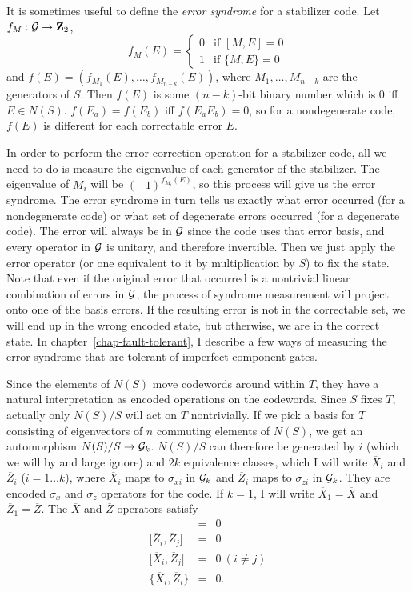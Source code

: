 \documentclass{report}
\newcommand{\G}{{\cal G}}
\newcommand{\X}{\sigma_x}
\newcommand{\Z}{\sigma_z}
\newcommand{\Xs}[1]{\sigma_{x{#1}}}
\newcommand{\Zs}[1]{\sigma_{z{#1}}}
\newcommand{\Xbar}{\overline{X}}
\newcommand{\Zbar}{\overline{Z}}
\begin{document}
It is sometimes useful to define the {\em error syndrome} for a stabilizer 
code.  Let $f_M : \G \rightarrow {\bf Z}_2$, 
\begin{equation}
f_M (E) = \left\{ \begin{array}{ll} 0 & \mbox{if $[M, E] = 0$} \\ 1 & 
\mbox{if $\{M, E\} = 0$} \end{array} \right.
\end{equation}
and $f (E) = (f_{M_1} (E), \ldots, f_{M_{n-k}} (E) )$, where $M_1, \ldots, 
M_{n-k}$ are the generators of $S$.  Then $f(E)$ is some $(n-k)$-bit binary 
number which is $0$ iff $E \in N(S)$.  $f(E_a) = f(E_b)$ iff $f(E_a E_b) = 0$, 
so for a nondegenerate code, $f(E)$ is different for each correctable error 
$E$.

In order to perform the error-correction operation for a stabilizer code, all 
we need to do is measure the eigenvalue of each generator of the 
stabilizer.  The eigenvalue of $M_i$ will be $(-1)^{f_{M_i} (E)}$, so this 
process will give us the error syndrome.  The error syndrome in turn tells 
us exactly what error occurred (for a nondegenerate code) or what set of 
degenerate errors occurred (for a degenerate code).  The error will always be 
in $\G$ since the code uses that error basis, and every operator in $\G$ is 
unitary, and therefore invertible.  Then we just apply the error operator (or 
one equivalent to it by multiplication by $S$) to fix the state.  Note that
even if the original error that occurred is a nontrivial linear combination of 
errors in $\G$, the process of syndrome measurement will project onto one
of the basis errors.  If the resulting error is not in the correctable set, 
we will end up in the wrong encoded state, but otherwise, we are in the 
correct state.  In chapter~\ref{chap-fault-tolerant}, I describe a few ways 
of measuring the error syndrome that are tolerant of imperfect component gates.

Since the elements of $N(S)$ move codewords around within $T$, they 
have a natural interpretation as encoded operations on the codewords.  
Since $S$ fixes $T$, actually only $N(S) / S$ will act on $T$ nontrivially.  If 
we pick a basis for $T$ consisting of eigenvectors of $n$ commuting elements 
of $N(S)$, we get an automorphism $N(S) / S \rightarrow \G_k$.  $N(S)/S$ can 
therefore be generated by $i$ (which we will by and large ignore) and $2k$ 
equivalence classes, which I will write $\Xbar_i$ and $\Zbar_i$ ($i=1 
\ldots k$), where $\Xbar_i$ maps to $\Xs{i}$ in $\G_k$ and $\Zbar_i$ 
maps to $\Zs{i}$ in $\G_k$.  They are encoded $\X$ and $\Z$ operators for 
the code.  If $k=1$, I will write $\Xbar_1 = \Xbar$ and $\Zbar_1 = \Zbar$.  
The $\Xbar$ and $\Zbar$ operators satisfy
\begin{eqnarray}
[\Xbar_i, \Xbar_j] & = & 0 \\
{[}\Zbar_i, \Zbar_j] & = & 0 \\
{[}\Xbar_i, \Zbar_j] & = & 0\ (i \neq j) \\
\{\Xbar_i, \Zbar_i \} & = & 0.
\end{eqnarray}
\end{document}
